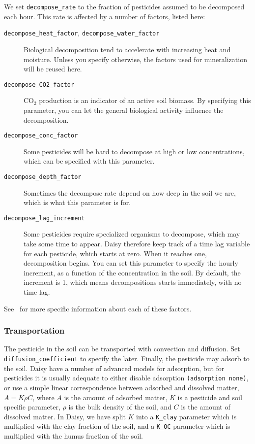 \documentclass[a4paper]{article}
\begin{document}
We set \texttt{decompose\_rate} to the fraction of pesticides assumed
to be decomposed each hour.  This rate is affected by a number of
factors, listed here:
\begin{description}
\item[\texttt{decompose\_heat\_factor},
  \texttt{decompose\_water\_factor}] Biological
  decomposition\linebreak{} tend to accelerate with increasing heat
  and moisture.  Unless you specify otherwise, the factors used for
  mineralization will be reused here.
\item[\texttt{decompose\_CO2\_factor}] CO$_2$ production is an
  indicator of an active soil biomass.  By specifying this parameter,
  you can let the general biological activity influence the
  decomposition. 
\item[\texttt{decompose\_conc\_factor}] Some pesticides will be hard
  to decompose at high or low concentrations, which can be specified
  with this parameter. 
\item[\texttt{decompose\_depth\_factor}] Sometimes the decompose rate
  depend on how deep in the soil we are, which is what this parameter
  is for. 
\item[\texttt{decompose\_lag\_increment}] Some pesticides require
  specialized organisms to decompose, which may take some time to
  appear.  Daisy therefore keep track of a time lag variable for
  each pesticide, which starts at zero.  When it reaches one,
  decomposition begins.  You can set this parameter to specify the
  hourly increment, as a function of the concentration in the soil.
  By default, the increment is 1, which means decompositions starts
  immediately, with no time lag.
\end{description}
See~\cite{dina81} for more specific information about each of these
factors. 

\subsubsection{Transportation}

The pesticide in the soil can be transported with convection and
diffusion.  Set \texttt{diffusion\_coefficient} to specify the later.
Finally, the pesticide may adsorb to the soil.  Daisy have a number
of advanced models for adsorption, but for pesticides it is usually
adequate to either disable adsorption \texttt{(adsorption none)}, or
use a simple linear correspondence between adsorbed and dissolved
matter, $A = K \rho C$, where $A$ is the amount of adsorbed matter,
$K$ is a pesticide and soil specific parameter, $\rho$ is the bulk
density of the soil, and $C$ is the amount of dissolved matter.  In
Daisy, we have split $K$ into a \texttt{K\_clay} parameter which is
multiplied with the clay fraction of the soil, and a \texttt{K\_OC}
parameter which is multiplied with the humus fraction of the soil.
\end{document}
